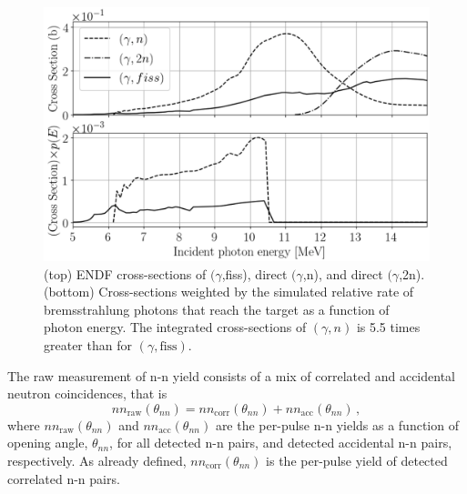 \begin{figure}[]
\centering
    \includegraphics[width=\figsize\textwidth]{CrossSections.png}
    \caption{(top) ENDF cross-sections of $(\gamma$,fiss), direct $(\gamma$,n), and direct $(\gamma$,2n).
    (bottom) Cross-sections weighted by the simulated relative rate of bremsstrahlung photons that reach the target as a function of photon energy. The integrated cross-sections of $(\gamma, n)$ is 5.5 times greater than for $(\gamma, \text{fiss})$. }
    \label{fig:CrossSection}
\end{figure}

The raw measurement of n-n yield consists of a mix of correlated and accidental neutron coincidences, that is
\begin{equation}
\label{eq:corr_uncorr}
nn_{\text{raw}}(\theta_{nn})= nn_{\text{corr}}(\theta_{nn}) + nn_{\text{acc}}(\theta_{nn}) \, ,
\end{equation}
where $nn_{\text{raw}}(\theta_{nn})$ and $nn_{\text{acc}}(\theta_{nn})$ are the per-pulse n-n yields as a function of opening angle, $\theta_{nn}$, for all detected n-n pairs, and detected accidental n-n pairs, respectively. As already defined, $ nn_{\text{corr}}(\theta_{nn})$ is the per-pulse yield of detected correlated n-n pairs.

